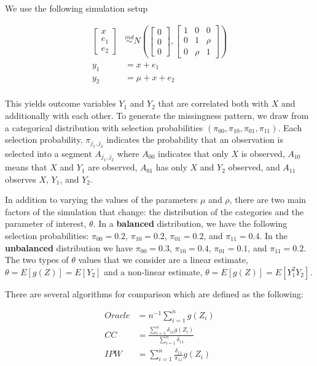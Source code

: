 \documentclass[
  letterpaper,
  DIV=11,
  numbers=noendperiod]{scrartcl}
\begin{document}
We use the following simulation setup

\begin{align*}
  \begin{bmatrix} x \\ e_1 \\ e_2 \end{bmatrix} 
  &\stackrel{ind}{\sim} N\left(\begin{bmatrix} 0 \\ 0 \\ 0 \end{bmatrix}, 
  \begin{bmatrix} 1 & 0 & 0 \\ 0 & 1 & \rho \\ 0 & \rho & 1 \end{bmatrix}\right) \\
  y_1 &= x + e_1 \\
  y_2 &= \mu + x + e_2 \\
\end{align*}

This yields outcome variables \(Y_1\) and \(Y_2\) that are correlated
both with \(X\) and additionally with each other. To generate the
missingness pattern, we draw from a categorical distribution with
selection probabilities \((\pi_{00}, \pi_{10}, \pi_{01}, \pi_{11})\).
Each selection probability, \(\pi_{j_1, j_2}\) indicates the probability
that an observation is selected into a segment \(A_{j_1, j_2}\) where
\(A_{00}\) indicates that only \(X\) is observed, \(A_{10}\) means that
\(X\) and \(Y_1\) are observed, \(A_{01}\) has only \(X\) and \(Y_2\)
observed, and \(A_{11}\) observes \(X\), \(Y_1\), and \(Y_2\).

In addition to varying the values of the parameters \(\mu\) and
\(\rho\), there are two main factors of the simulation that change: the
distribution of the categories and the parameter of interest,
\(\theta\). In a \textbf{balanced} distribution, we have the following
selection probabilities: \(\pi_{00} = 0.2\), \(\pi_{10} = 0.2\),
\(\pi_{01} = 0.2\), and \(\pi_{11} = 0.4\). In the \textbf{unbalanced}
distribution we have \(\pi_{00} = 0.3\), \(\pi_{10} = 0.4\),
\(\pi_{01} = 0.1\), and \(\pi_{11} = 0.2\). The two types of \(\theta\)
values that we consider are a linear estimate,
\(\theta = E[g(Z)] = E[Y_2]\) and a non-linear estimate,
\(\theta = E[g(Z)] = E[Y_1^2 Y_2]\).

There are several algorithms for comparison which are defined as the
following:

\begin{align*}
  Oracle &= n^{-1} \sum_{i = 1}^n g(Z_i)\\
  CC &= \frac{\sum_{i = 1}^n \delta_{11} g(Z_i)}{\sum_{i = 1}^n \delta_{11}} \\
  IPW &= \sum_{i = 1}^n \frac{\delta_{11}}{\pi_{11}} g(Z_i)\\
\end{align*}
\end{document}
